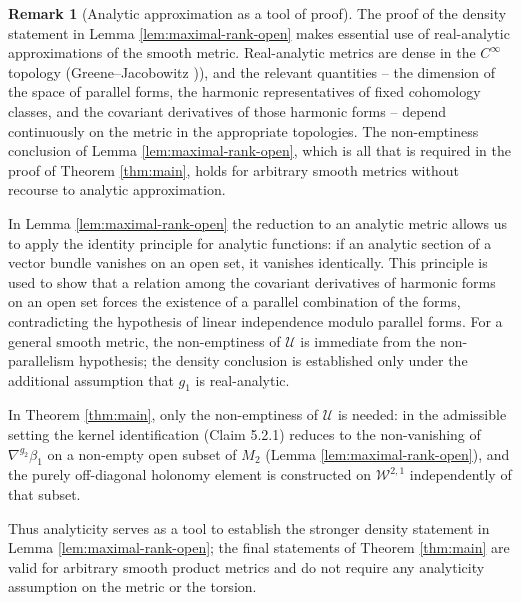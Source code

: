 \documentclass[11pt,reqno]{amsart}
\theoremstyle{plain}
\theoremstyle{definition}
\newtheorem{remark}[theorem]{Remark}
\numberwithin{equation}{section}
\begin{document}
\begin{remark}[Analytic approximation as a tool of proof]
\label{non-analytic}
The proof of the density statement in Lemma \ref{lem:maximal-rank-open} makes essential use of real-analytic approximations of the smooth metric. Real-analytic metrics are dense in the $C^\infty$ topology (Greene–Jacobowitz \cite{GreeneJacobowitz})), and the relevant quantities – the dimension of the space of parallel forms, the harmonic representatives of fixed cohomology classes, and the covariant derivatives of those harmonic forms – depend continuously on the metric in the appropriate topologies. The non-emptiness conclusion of Lemma \ref{lem:maximal-rank-open}, which is all that is required in the proof of Theorem \ref{thm:main}, holds for arbitrary smooth metrics without recourse to analytic approximation.

In Lemma \ref{lem:maximal-rank-open} the reduction to an analytic metric allows us to apply the identity principle for analytic functions: if an analytic section of a vector bundle vanishes on an open set, it vanishes identically.  This principle is used to show that a relation among the covariant derivatives of harmonic forms on an open set forces the existence of a parallel combination of the forms, contradicting the hypothesis of linear independence modulo parallel forms. For a general smooth metric, the non-emptiness of $\mathcal{U}$ is immediate from the non-parallelism hypothesis; the density conclusion is established only under the additional assumption that $g_1$ is real-analytic.

In Theorem \ref{thm:main}, only the non-emptiness of $\mathcal{U}$ is needed: in the admissible setting the kernel identification (Claim 5.2.1) reduces to the non-vanishing of $\nabla^{g_2}\beta_1$ on a non-empty open subset of $M_2$
(Lemma \ref{lem:maximal-rank-open}), and the purely off-diagonal holonomy element is constructed on $\mathcal{W}^{2,1}$ independently of that subset.   

Thus analyticity serves as a tool to establish the stronger density statement in Lemma \ref{lem:maximal-rank-open}; the final statements of Theorem \ref{thm:main} are valid for arbitrary smooth product metrics and do not require any analyticity assumption on the metric or the torsion.

\end{remark}
\end{document}

